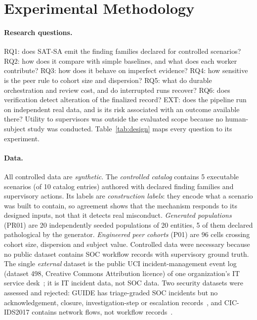 \section{Experimental Methodology}
\label{sec:method}

\paragraph{Research questions.} RQ1: does SAT-SA emit the finding families declared
for controlled scenarios? RQ2: how does it compare with simple baselines, and what
does each worker contribute? RQ3: how does it behave on imperfect evidence? RQ4: how
sensitive is the peer rule to cohort size and dispersion? RQ5: what do durable
orchestration and review cost, and do interrupted runs recover? RQ6: does
verification detect alteration of the finalized record? EXT: does the pipeline run
on independent real data, and is its risk associated with an outcome available
there? Utility to supervisors was outside the evaluated scope because no
human-subject study was conducted. Table~\ref{tab:design} maps every question to
its experiment.



\paragraph{Data.} All controlled data are \emph{synthetic}. The \emph{controlled
catalog} contains 5 executable scenarios (of 10
catalog entries) authored with declared finding families and supervisory actions.
Its labels are \emph{construction labels}: they encode what a scenario was built to
contain, so agreement shows that the mechanism responds to its designed inputs, not
that it detects real misconduct. \emph{Generated populations} (PR01) are
20 independently seeded populations of 20 entities,
5 of them declared pathological by the generator.
\emph{Engineered peer cohorts} (P01) are 96 cells crossing cohort size,
dispersion and subject value. Controlled data were necessary because no public dataset
contains SOC workflow records with supervisory ground truth. The single \emph{external}
dataset is the public UCI incident-management event log (dataset 498, Creative Commons Attribution licence) of one
organization's IT service desk~\cite{amaral2018uci498,amaral2019completion}; it is IT
incident data, not SOC data. Two security datasets were assessed and rejected: GUIDE
has triage-graded SOC incidents but no acknowledgement, closure, investigation-step or
escalation records~\cite{freitas2024guide}, and CIC-IDS2017 contains network flows,
not workflow records~\cite{sharafaldin2018cicids}.

